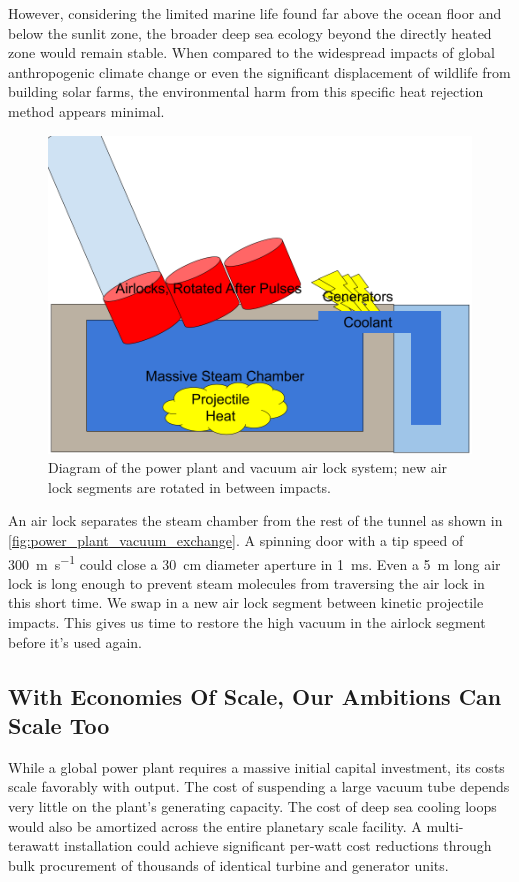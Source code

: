 \documentclass{article}
\begin{document}
However, considering the limited marine life found far above the ocean floor and below the sunlit zone, the broader deep sea ecology beyond the directly heated zone would remain stable. When compared to the widespread impacts of global anthropogenic climate change or even the significant displacement of wildlife from building solar farms, the environmental harm from this specific heat rejection method appears minimal.


\begin{figure}[htpb]
    \centering
    \includegraphics[width=0.5\linewidth]{images/Power Plant Cooling and Generators.png}
    \caption{Diagram of the power plant and vacuum air lock system; new air lock segments are rotated in between impacts.}
    \label{fig:power_plant_vacuum_exchange}
\end{figure}

An air lock separates the steam chamber from the rest of the tunnel as shown in \autoref{fig:power_plant_vacuum_exchange}.   A spinning door with a tip speed of \SI{300}{\meter\per\second} could close a \SI{30}{\centi\meter} diameter aperture in \SI{1}{\milli\second}.  Even a \SI{5}{\meter} long air lock is long enough to prevent steam molecules from traversing the air lock in this short time.   We swap in a new air lock segment between kinetic projectile impacts.  This gives us time to restore the high vacuum in the airlock segment before it's used again.   


\subsection{With Economies Of Scale, Our Ambitions Can Scale Too}\label{sec:strawway_economics}

While a global power plant requires a massive initial capital investment, its costs scale favorably with output. The cost of suspending a large vacuum tube depends very little on the plant's generating capacity. The cost of deep sea cooling loops would also be amortized across the entire planetary scale facility.  A multi-terawatt installation could achieve significant per-watt cost reductions through bulk procurement of thousands of identical turbine and generator units. 
\end{document}
